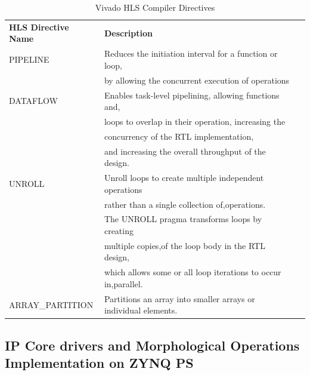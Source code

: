 \documentclass[12pt,a4paper]{report}
\begin{document}
\begin{table}[]
\centering
\caption{Vivado HLS Compiler Directives}
\label{pragma}
\begin{tabular}{|l|l|l}
\cline{1-2}
\textbf{HLS Directive Name} & \textbf{Description}                                                                                                                                                                                                                                                     &  \\ \cline{1-2}
PIPELINE                    & Reduces the initiation interval for a function or loop,\\ & by allowing the concurrent execution of operations                                                                                                                                                                &  \\ \cline{1-2}
DATAFLOW                    & Enables task-level pipelining, allowing functions and,\\ & loops to overlap in their operation, increasing the \\ & concurrency of the RTL implementation,\\ & and increasing the overall throughput of the design.                                                                    &  \\ \cline{1-2}
UNROLL                      & Unroll loops to create multiple independent operations\\ & rather than a single collection of,operations. \\ & The UNROLL pragma transforms loops by creating \\ & multiple copies,of the loop body in the RTL design, \\ & which allows some or all loop iterations to occur in,parallel. &  \\ \cline{1-2}
ARRAY\_PARTITION            & Partitions an array into smaller arrays or individual elements.                                                                                                                                                                                                          &  \\ \cline{1-2}
\end{tabular}
\end{table}


\subsection{IP Core drivers and Morphological Operations Implementation on ZYNQ PS}
\end{document}
